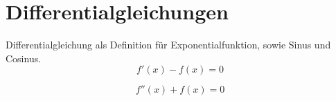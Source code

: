 
\chapter{Differentialgleichungen}\label{chap:diffgl}

\begin{TODO}
Differentialgleichung als Definition für Exponentialfunktion, sowie Sinus und Cosinus. 
\begin{equation*}
f'(x) -f(x) = 0
\end{equation*}

\begin{equation*}
f''(x) +f(x) = 0
\end{equation*}
\end{TODO}